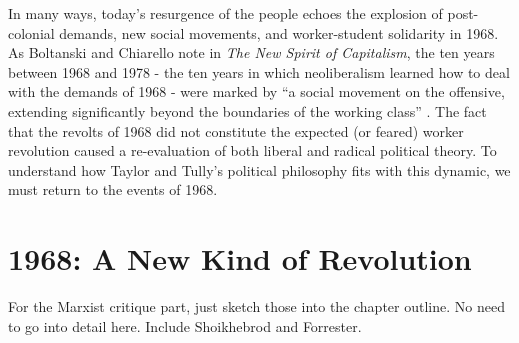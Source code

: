 \documentclass[12pt,oneside]{memoir}
\begin{document}
In many ways, today’s resurgence of the people echoes the explosion of post-colonial demands, new social movements, and worker-student solidarity in 1968. As Boltanski and Chiarello note in \emph{The New Spirit of Capitalism}, the ten years between 1968 and 1978 - the ten years in which neoliberalism learned how to deal with the demands of 1968 - were marked by “a social movement on the offensive, extending significantly beyond the boundaries of the working class” \citep[167]{BoltanskiChiarello2005}. The fact that the revolts of 1968 did not constitute the expected (or feared) worker revolution caused a re-evaluation of both liberal and radical political theory. To understand how Taylor and Tully’s political philosophy fits with this dynamic, we must return to the events of 1968.

\section*{1968: A New Kind of Revolution}



For the Marxist critique part, just sketch those into the chapter outline. No need to go into detail here. Include Shoikhebrod and Forrester.


 


\backmatter

 

\end{document}

